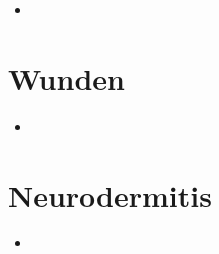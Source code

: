 
\begin{itemize}
	\item 
\end{itemize}



\section{Wunden}


\begin{itemize}
	\item 
\end{itemize}



\section{Neurodermitis}


\begin{itemize}
	\item 
\end{itemize}


